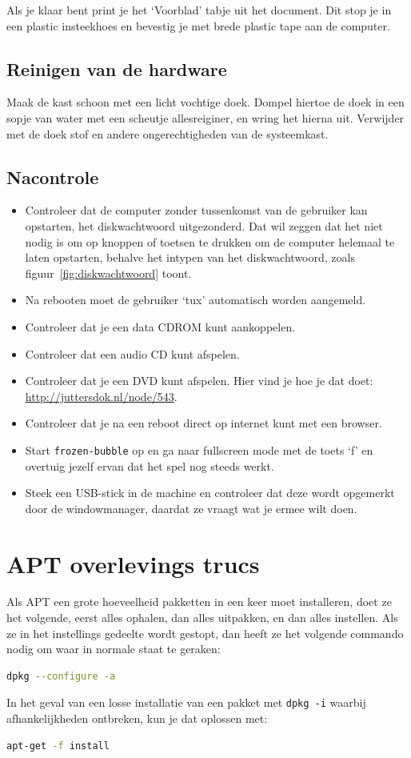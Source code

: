 \documentclass[12pt,a4paper]{article}
\begin{document}
Als je klaar bent print je het `Voorblad' tabje uit het document. Dit stop je in een plastic insteekhoes en bevestig je met brede plastic tape aan de computer.
\subsection{Reinigen van de hardware}
Maak de kast schoon met een licht vochtige doek. Dompel hiertoe de doek in een sopje van water met een scheutje allesreiginer, en wring het hierna uit. Verwijder met de doek stof en andere ongerechtigheden van de systeemkast.
\subsection{Nacontrole}
\begin{itemize}
	\item Controleer dat de computer zonder tussenkomst van de gebruiker kan opstarten, het diskwachtwoord uitgezonderd. Dat wil zeggen dat het niet nodig is om op knoppen of toetsen te drukken om de computer helemaal te laten opstarten, behalve het intypen van het diskwachtwoord, zoals figuur~\ref{fig:diskwachtwoord} toont.
	\item Na rebooten moet de gebruiker `tux' automatisch worden aangemeld.
	\item Controleer dat je een data CDROM kunt aankoppelen.
  \item Controleer dat een audio CD kunt afspelen.
  \item Controleer dat je een DVD kunt afspelen. Hier vind je hoe je dat doet:\\ \url{http://juttersdok.nl/node/543}.
	\item Controleer dat je na een reboot direct op internet kunt met een browser.
	\item Start \texttt{frozen-bubble} op en ga naar fullscreen mode met de toets `f' en overtuig jezelf ervan dat het spel nog steeds werkt.
  \item Steek een USB-stick in de machine en controleer dat deze wordt opgemerkt door de windowmanager, daardat ze vraagt wat je ermee wilt doen.
\end{itemize}
\appendix
\section{APT overlevings trucs}
Als APT een grote hoeveelheid pakketten in een keer moet installeren, doet ze het volgende, eerst alles ophalen, dan alles uitpakken, en dan alles instellen. Als ze in het instellings gedeelte wordt gestopt, dan heeft ze het volgende commando nodig om waar in normale staat te geraken:
\begin{lstlisting}[language=bash]
dpkg --configure -a
\end{lstlisting}

In het geval van een losse installatie van een pakket met \texttt{dpkg -i} waarbij afhankelijkheden ontbreken, kun je dat oplossen met:
\begin{lstlisting}[language=bash]
apt-get -f install
\end{lstlisting}
\end{document}
